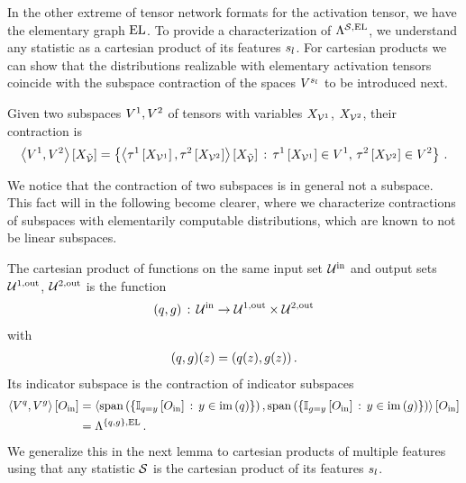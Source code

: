 In the other extreme of tensor network formats for the activation tensor, we have the elementary graph $\mathrm{EL}$.
To provide a characterization of $\Lambda^{\mathcal{S},\mathrm{EL}}$, we understand any statistic as a cartesian product of its features $s_{l}$.
For cartesian products we can show that the distributions realizable with elementary activation tensors coincide with the subspace contraction of the spaces $V^{s_{l}}$ to be introduced next.

\begin{definition}
    Given two subspaces $V^{1},V^{2}$ of tensors with variables $X_{\mathcal{V}^{1}}$, $X_{\mathcal{V}^{2}}$, their contraction is
    \begin{align*}
        \left\langle V^{1},V^{2}\right\rangle \left[ X_{\tilde{\mathcal{V}}} \right]
        = \left\{ \left\langle \tau^{1}\left[X_{\mathcal{V}^{1}}\right],\tau^{2}\left[X_{\mathcal{V}^{2}}\right]\right\rangle \left[ X_{\tilde{\mathcal{V}}} \right]
        \,:\, \tau^{1}\left[X_{\mathcal{V}^{1}}\right]\in V^{1}, \, \tau^{2}\left[X_{\mathcal{V}^{2}}\right]\in V^{2} \right\} \, .
    \end{align*}
\end{definition}

We notice that the contraction of two subspaces is in general not a subspace.
This fact will in the following become clearer, where we characterize contractions of subspaces with elementarily computable distributions, which are known to not be linear subspaces.

The cartesian product of functions on the same input set $\mathcal{U}^{\mathrm{in}}$ and output sets $\mathcal{U}^{1,\mathrm{out}}$, $\mathcal{U}^{2,\mathrm{out}}$ is the function
\begin{align*}
(q,g)
   \,:\, \mathcal{U}^{\mathrm{in}} \rightarrow \mathcal{U}^{1,\mathrm{out}} \times \mathcal{U}^{2,\mathrm{out}}
\end{align*}
with
\begin{align*}
(q,g)(z)
    = (q(z),g(z)) \, .
\end{align*}
Its indicator subspace is the contraction of indicator subspaces
\begin{align*}
    \left\langle V^{q},V^{g}\right\rangle \left[ O_{\mathrm{in}} \right]
    & = \left\langle 
        \mathrm{span}\left(\{\mathbb{I}_{q=y}\left[O_{\mathrm{in}}\right] \,:\, y\in\mathrm{im}\left(q\right)\}\right),
        \mathrm{span}\left(\{\mathbb{I}_{g=y}\left[O_{\mathrm{in}}\right] \,:\, y\in\mathrm{im}\left(g\right)\}\right)
    \right\rangle \left[ O_{\mathrm{in}} \right] \\
    & = \Lambda^{\{q, g\},\mathrm{EL}} \, .
\end{align*}
We generalize this in the next lemma to cartesian products of multiple features using that any statistic $\mathcal{S}$ is the cartesian product of its features $s_{l}$.

